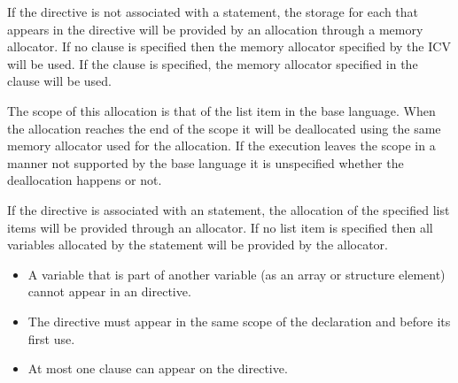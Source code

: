\descr

If the directive is not associated with a statement, the storage for each  that appears in the directive will be provided by an allocation through a memory allocator. If no clause is specified then the memory allocator specified by the  ICV will be used. If the  clause is specified, the memory allocator specified in the clause will be used.

The scope of this allocation is that of the list item in the base language. When the allocation reaches the end of the scope it will be deallocated using the same memory allocator used for the allocation. If the execution leaves the scope in a manner not supported by the base language it is unspecified whether the deallocation happens or not.

\begin{fortranspecific}
If the directive is associated with an  statement, the allocation of the specified list items will be provided through an allocator. If no list item is specified then all variables allocated by the  statement will be provided by the allocator.
\end{fortranspecific}

\restrictions
\begin{itemize}
\item A variable that is part of another variable (as an array or structure element) cannot appear in an  directive.
\item The directive must appear in the same scope of the  declaration and before its first use.
\item At most one  clause can appear on the  directive.
\end{itemize}

